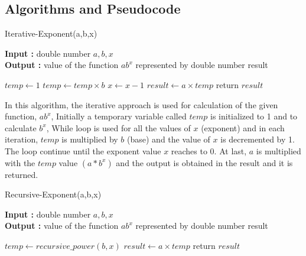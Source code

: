 \documentclass[12pt, a4paper]{article}
\begin{document}
\subsection{Algorithms and Pseudocode}
\begin{algorithm}[hbt!]
\caption{Iterative-Exponent(a,b,x)}\label{alg:one}

\hspace*{\algorithmicindent} \textbf{Input : }double number $a,b,x$ \\
\hspace*{\algorithmicindent} \textbf{Output : }value of the function $ab^x$ represented by double number result
\begin{algorithmic}[1]
\STATE $temp \gets 1$
  \STATE $temp \gets temp \times b$
  \STATE $x \gets x - 1$
\ENDWHILE
\STATE $result \gets a \times temp$
\STATE return $result$
\end{algorithmic}
\end{algorithm}

In this algorithm, the iterative approach is used for calculation of the given function, $ab^x$, Initially a temporary  variable called $temp$ is initialized to 1 and to calculate $b^x$, While loop is used for all the values of $x$ (exponent) and in each iteration, $temp$ is multiplied by $b$ (base) and the value of $x$ is decremented by 1. The loop continue until the exponent value $x$ reaches to 0. At last, $a$ is multiplied with the $temp$ value $(a*b^x)$ and the output is obtained in the result and it is returned.

\newpage

\begin{algorithm}[hbt!]
\caption{Recursive-Exponent(a,b,x)}\label{alg:two}

\hspace*{\algorithmicindent} \textbf{Input : }double number $a,b,x$ \\
\hspace*{\algorithmicindent} \textbf{Output : }value of the function $ab^x$ represented by double number result
\begin{algorithmic}[1]
\STATE $temp \gets recursive\_power(b,x)$
\STATE $result \gets a \times temp$
\STATE return $result$
\end{algorithmic}
\end{algorithm}
\end{document}
